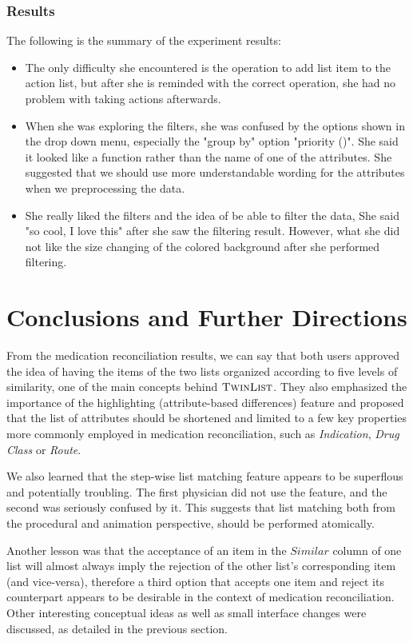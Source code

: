 \documentclass{chi2009}
\newcommand{\TwinList}{\textsc{TwinList}}
\newcommand{\Similar}{\textit{Similar}}
\begin{document}
\subsubsection{Results}
The following is the summary of the experiment results:
\begin{itemize}
\item The only difficulty she encountered is the operation to add list item to the action list, but after she is reminded with the correct operation, she had no problem with taking actions afterwards.

\item When she was exploring the filters, she was confused by the options shown in the drop down menu, especially the "group by" option  "priority ()". She said it looked like a function rather than the name of one of the attributes. She suggested that we should use more understandable wording for the attributes when we preprocessing the data. 
\item She really liked the filters and the idea of be able to filter the data, She said "so cool, I love this" after she saw the filtering result. However, what she did not like the size changing of the colored background after she performed filtering. 

\end{itemize}


\section{Conclusions and Further Directions}


From the medication reconciliation results, we can say that both users approved the idea of having the items of the two lists organized according to five levels of similarity, one of the main concepts behind $\TwinList$. They also emphasized the importance of the highlighting (attribute-based differences) feature and proposed that the list of attributes should be shortened and limited to a few key properties more commonly employed in medication reconciliation, such as \textit{Indication}, \textit{Drug Class} or \textit{Route}.

We also learned that the step-wise list matching feature appears to be superflous and potentially troubling. The first physician did not use the feature, and the second was seriously confused by it. This suggests that list matching both from the procedural and animation perspective, should be performed atomically. 

Another lesson was that the acceptance of an item in the $\Similar$ column of one list will almost always imply the rejection of the other list's corresponding item (and vice-versa), therefore a third option that accepts one item and reject its counterpart appears to be desirable in the context of medication reconciliation. Other interesting conceptual ideas as well as small interface changes were discussed, as detailed in the previous section.






\end{document}
